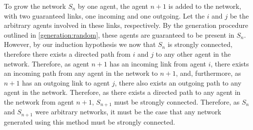 \documentclass{article}
\begin{document}
To grow the network $S_n$ by one agent, the agent $n+1$ is added to the network, with two guaranteed links, one incoming and one outgoing. Let the $i$ and $j$ be the arbitrary agents involved in these links, respectively. By the generation procedure outlined in \ref{generation:random}, these agents are guaranteed to be present in $S_n$. However, by our induction hypothesis we now that $S_n$ is strongly connected, therefore there exists a directed path from $i$ and $j$ to any other agent in the network. Therefore, as agent $n+1$ has an incoming link from agent $i$, there exists an incoming path from any agent in the network to $n+1$, and, furthermore, as $n+1$ has an outgoing link to agent $j$, there also exists an outgoing path to any agent in the network. Therefore, as there exists a directed path to any agent in the network from agent $n+1$, $S_{n+1}$ must be strongly connected.\newline
Therefore, as $S_n$ and $S_{n+1}$ were arbitrary networks, it must be the case that any network generated using this method must be strongly connected.\newline


%
%
\end{document}
